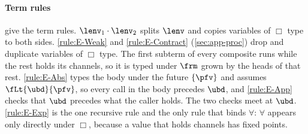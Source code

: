 \paragraph{Term rules}
 give the term rules. $\lenv_1 \cdot \lenv_2$ splits
$\lenv$ and copies variables of $\Box$ type to both sides.
\ref{rule:E-Weak} and \ref{rule:E-Contract} (\cref{sec:app-proc}) drop
and duplicate variables of $\Box$ type. The first
subterm of every composite runs while the rest holds its channels, so it
is typed under $\frm$ grown by the heads of that rest.
\ref{rule:E-Abs} types the body under the future $\set{\pfv}$ and assumes
$\fLt{\ubd}{\pfv}$, so every call in the body precedes $\ubd$, and
\ref{rule:E-App} checks that $\ubd$ precedes what the caller holds. The
two checks meet at $\ubd$.
\ref{rule:E-Exp} is the one recursive rule and the only rule that binds
$\forall$: $\forall$ appears only directly under $\Box$, because a value
that holds channels has fixed points.


